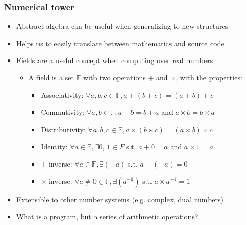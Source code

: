 \documentclass{beamer}
\begin{document}


    \begin{frame}
        \frametitle{Numerical tower}
        \begin{itemize}
            \item Abstract algebra can be useful when generalizing to new structures
            \item Helps us to easily translate between mathematics and source code
            \item Fields are a useful concept when computing over real numbers
            \begin{itemize}
                \item A field is a set $\mathbb{F}$ with two operations $+$ and $\times$, with the properties:
                \begin{itemize}
                    \item Associativity: $\forall a, b, c \in \mathbb{F}, a + (b + c) = (a + b) + c$
                    \item Commutivity: $\forall a, b \in \mathbb{F}, a + b = b + a$ and $a\times b = b\times a$
                    \item Distributivity: $\forall a, b, c \in \mathbb{F}, a \times (b \times c) = (a \times b) \times c$
                    \item Identity: $\forall a \in \mathbb{F}, \exists 0$, $ 1 \in F$ s.t. $a + 0 = a$ and $a\times 1= a$
                    \item $+$ inverse: $\forall a\in \mathbb{F}, \exists (-a)$ s.t. $a + (-a) = 0$
                    \item $\times$ inverse: $\forall a\neq 0 \in \mathbb{F}, \exists (a^{-1})$ s.t. $a \times a^{-1} = 1$
                \end{itemize}
            \end{itemize}
            \item Extensible to other number systems (e.g. complex, dual numbers)
            \item What is a program, but a series of arithmetic operations?
        \end{itemize}
    \end{frame}
\end{document}
